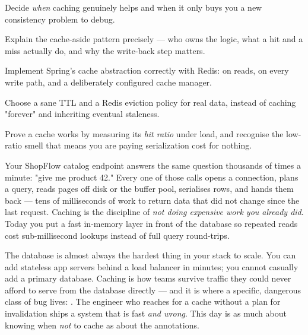 
\begin{objectives}
\begin{wbitem}
  \item Decide \emph{when} caching genuinely helps and when it only buys you a new consistency problem to debug.
  \item Explain the cache-aside pattern precisely --- who owns the logic, what a hit and a miss actually do, and why the write-back step matters.
  \item Implement Spring's cache abstraction correctly with Redis:  on reads,  on every write path, and a deliberately configured cache manager.
  \item Choose a sane TTL and a Redis eviction policy for real data, instead of caching "forever" and inheriting eventual staleness.
  \item Prove a cache works by measuring its \emph{hit ratio} under load, and recognise the low-ratio smell that means you are paying serialization cost for nothing.
\end{wbitem}
\end{objectives}


 Your ShopFlow catalog endpoint answers the same question thousands of times a minute: "give me product 42." Every one of those calls opens a connection, plans a query, reads pages off disk or the buffer pool, serialises rows, and hands them back --- tens of milliseconds of work to return data that did not change since the last request. Caching is the discipline of \emph{not doing expensive work you already did}. Today you put a fast in-memory layer in front of the database so repeated reads cost sub-millisecond lookups instead of full query round-trips.

 The database is almost always the hardest thing in your stack to scale. You can add stateless app servers behind a load balancer in minutes; you cannot casually add a primary database. Caching is how teams survive traffic they could never afford to serve from the database directly --- and it is where a specific, dangerous class of bug lives: . The engineer who reaches for a cache without a plan for invalidation ships a system that is fast \emph{and wrong}. This day is as much about knowing when \emph{not} to cache as about the annotations.

